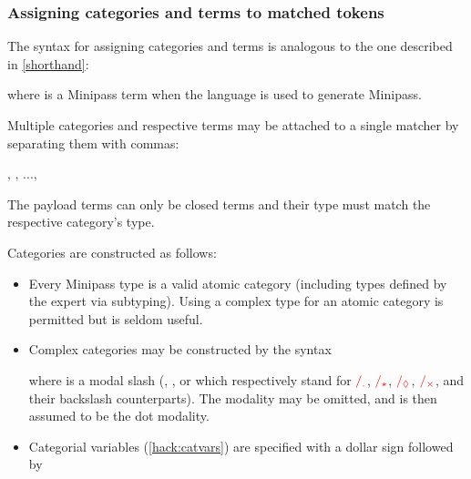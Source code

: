 \documentclass[main.tex]{subfiles}
\begin{document}
\subsubsection{Assigning categories and terms to matched tokens}
The syntax for assigning categories and terms is analogous to the one described
in \cref{shorthand}:
\begin{center}
    \code{:}
\end{center}
where  is a Minipass term when the language is used to generate
Minipass.

Multiple categories and respective terms may be attached to a single
matcher by separating them with commas:
\begin{center}
    \code{:},
    , ...,
\end{center}

The payload terms can only be closed terms and their type must match the
respective category's type.

Categories are constructed as follows:
\begin{itemize}
    \item Every Minipass type is a valid atomic category (including types defined
        by the expert via subtyping). Using a complex type for an atomic
        category is permitted but is seldom useful.
    \item Complex categories may be constructed by the syntax
        \begin{center}
        \end{center}
        where  is a modal slash (, ,
         or  which respectively stand for $\textcolor{red}{/_{.}}$,
        $\textcolor{red}{/_{\star}}$, $\textcolor{red}{/_{\lozenge}}$, $\textcolor{red}{/_{\times}}$, and their backslash
        counterparts). The modality may be omitted, and is then assumed to be
        the dot modality.
    \item Categorial variables (\cref{hack:catvars}) are specified with a
        dollar sign followed by \code{[a-zA-Z][a-zA-Z0-9\_]*}
\end{itemize}
\end{document}
